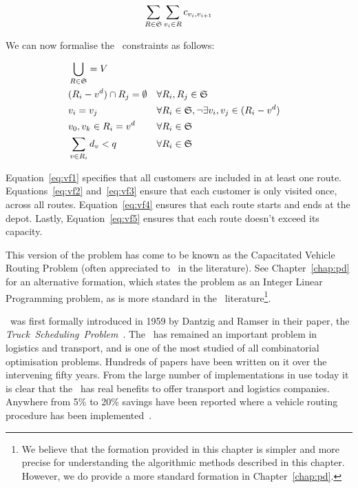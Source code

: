 \[
   \sum_{R \in \mathfrak{S}} \sum_{v_i \in R} c_{v_i, v_{i+1}}
\]

We can now formalise the \VRP\ constraints as follows:

\begin{align}
   & \bigcup_{R \in \mathfrak{S}} = V \label{eq:vf1}\\
   & (R_i - v^d) \cap R_j = \emptyset  && \forall R_i, R_j \in \mathfrak{S} \label{eq:vf2}\\
   & v_i = v_j                               && \forall R_i \in \mathfrak{S}, \lnot \exists v_i, v_j \in (R_i - v^d) \label{eq:vf3}\\
   & v_0, v_k \in R_i = v^d                  && \forall R_i \in \mathfrak{S} \label{eq:vf4}\\
   & \sum_{v \in R_i} d_v < q                && \forall R_i \in \mathfrak{S} \label{eq:vf5}
\end{align}

Equation~\eqref{eq:vf1} specifies that all customers are included in at least one route. Equations~\eqref{eq:vf2} and~\eqref{eq:vf3} ensure that each customer is only visited once, across all routes. Equation~\eqref{eq:vf4} ensures that each route starts and ends at the depot. Lastly, Equation~\eqref{eq:vf5} ensures that each route doesn't exceed its capacity.

This version of the problem has come to be known as the Capacitated Vehicle Routing Problem (often appreciated to \CVRP\ in the literature). See Chapter~\ref{chap:pd} for an alternative formation, which states the problem as an Integer Linear Programming problem, as is more standard in the \VRP\ literature\footnote{We believe that the formation provided in this chapter is simpler and more precise for understanding the algorithmic methods described in this chapter. However, we do provide a more standard formation in Chapter~\ref{chap:pd}.}.

\VRP\ was first formally introduced in 1959 by Dantzig and Ramser in their paper, the \emph{Truck~Scheduling~Problem}~\cite{Dantzig:1959}. The \VRP\ has remained an important problem in logistics and transport, and is one of the most studied of all combinatorial optimisation problems. Hundreds of papers have been written on it over the intervening fifty years. From the large number of implementations in use today it is clear that the \VRP\ has real benefits to offer transport and logistics companies. Anywhere from 5\% to 20\% savings have been reported where a vehicle routing procedure has been implemented~\cite{TV2001}.

